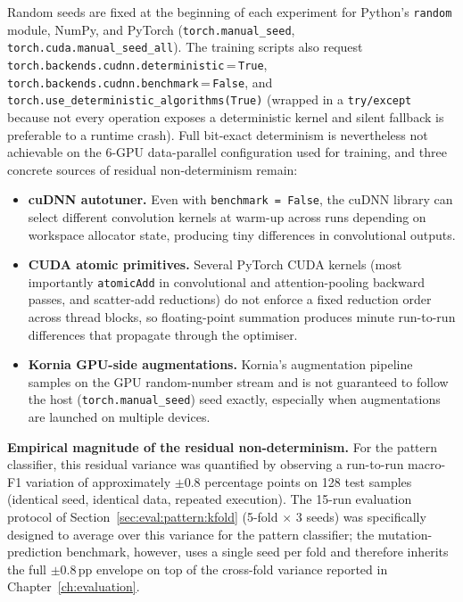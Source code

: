 Random seeds are fixed at the beginning of each experiment for
Python's \texttt{random} module, NumPy, and PyTorch
(\texttt{torch.manual\_seed}, \texttt{torch.cuda.manual\_seed\_all}).
The training scripts also request
\texttt{torch.\allowbreak backends.\allowbreak cudnn.\allowbreak deterministic}\,=\,\texttt{True},
\texttt{torch.\allowbreak backends.\allowbreak cudnn.\allowbreak benchmark}\,=\,\texttt{False}, and
\texttt{torch.\allowbreak use\_deterministic\_\allowbreak algorithms(True)}
(wrapped in a \texttt{try/except} because not every operation exposes
a deterministic kernel and silent fallback is preferable to a runtime
crash).
Full bit-exact determinism is nevertheless not achievable on the
6-GPU data-parallel configuration used for training, and three
concrete sources of residual non-determinism remain:
\begin{itemize}
  \item \textbf{cuDNN autotuner.}
        Even with \texttt{benchmark = False}, the cuDNN library can
        select different convolution kernels at warm-up across
        runs depending on workspace allocator state, producing tiny
        differences in convolutional outputs.
  \item \textbf{CUDA atomic primitives.}
        Several PyTorch CUDA kernels (most importantly
        \texttt{atomicAdd} in convolutional and attention-pooling
        backward passes, and scatter-add reductions) do not enforce
        a fixed reduction order across thread blocks, so
        floating-point summation produces minute run-to-run
        differences that propagate through the optimiser.
  \item \textbf{Kornia GPU-side augmentations.}
        Kornia's augmentation pipeline samples on the GPU
        random-number stream and is not guaranteed to follow the
        host (\texttt{torch.manual\_seed}) seed exactly, especially
        when augmentations are launched on multiple devices.
\end{itemize}

\textbf{Empirical magnitude of the residual non-determinism.}
For the pattern classifier, this residual variance was quantified by
observing a run-to-run macro-F1 variation of approximately
$\pm 0.8$ percentage points on 128 test samples (identical seed,
identical data, repeated execution).
The 15-run evaluation protocol of
Section~\ref{sec:eval:pattern:kfold} (5-fold $\times$ 3 seeds) was
specifically designed to average over this variance for the pattern
classifier; the mutation-prediction benchmark, however, uses a single
seed per fold and therefore inherits the full $\pm 0.8$\,pp envelope
on top of the cross-fold variance reported in
Chapter~\ref{ch:evaluation}.

